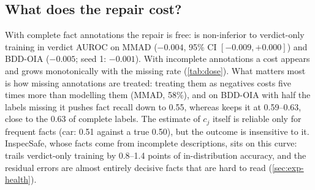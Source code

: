 \subsection{What does the repair cost?}
\label{sec:exp-cost}

\begin{table}[t]\centering\small
\caption{\textbf{Incomplete annotations.} Top: MMAD, defect-type labels kept at random in the training set; $\Delta$AUROC relative to verdict-only training. Bottom: BDD-OIA with half of the reason labels missing.}
\label{tab:dose}
\end{table}

With complete fact annotations the repair is free: \lux is non-inferior to verdict-only training in verdict AUROC on MMAD ($-0.004$, 95\% CI $[-0.009,+0.000]$) and BDD-OIA ($-0.005$; seed 1: $-0.001$). With incomplete annotations a cost appears and grows monotonically with the missing rate (\cref{tab:dose}). What matters most is how missing annotations are treated: treating them as negatives costs five times more than modelling them (MMAD, 58\%), and on BDD-OIA with half the labels missing it pushes fact recall down to 0.55, whereas \lux keeps it at 0.59--0.63, close to the 0.63 of complete labels. The estimate of $c_j$ itself is reliable only for frequent facts (car: 0.51 against a true 0.50), but the outcome is insensitive to it. InspecSafe, whose facts come from incomplete descriptions, sits on this curve: \lux trails verdict-only training by 0.8--1.4 points of in-distribution accuracy, and the residual errors are almost entirely decisive facts that are hard to read (\cref{sec:exp-health}).

